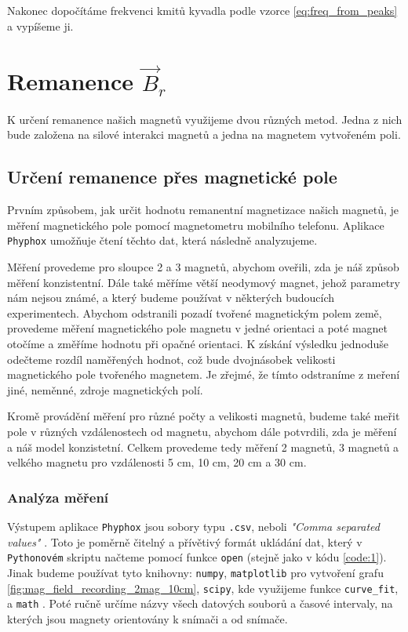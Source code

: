 Nakonec dopočítáme frekvenci kmitů kyvadla podle vzorce \ref{eq:freq_from_peaks} a vypíšeme ji.

\clearpage



\section{Remanence $\vec{B}_r$}
\label{sec:remanence_measurement}

K určení remanence našich magnetů využijeme dvou různých metod. Jedna z nich bude založena na silové interakci magnetů a jedna na magnetem vytvořeném poli.

\subsection{Určení remanence přes magnetické pole}

Prvním způsobem, jak určit hodnotu remanentní magnetizace našich magnetů, je měření magnetického pole pomocí magnetometru mobilního telefonu.
Aplikace \texttt{Phyphox} umožňuje čtení těchto dat, která následně analyzujeme.

Měření provedeme pro sloupce 2 a 3 magnetů, abychom oveřili, zda je náš způsob měření konzistentní.
Dále také měříme větší neodymový magnet, jehož parametry nám nejsou známé, a který budeme používat v některých budoucích experimentech.
Abychom odstranili pozadí tvořené magnetickým polem země, provedeme měření magnetického pole magnetu v jedné orientaci a poté magnet otočíme a změříme hodnotu při opačné orientaci.
K získání výsledku jednoduše odečteme rozdíl naměřených hodnot, což bude dvojnásobek velikosti magnetického pole tvořeného magnetem.
Je zřejmé, že tímto odstraníme z meření jiné, neměnné, zdroje magnetických polí.

Kromě provádění měření pro různé počty a velikosti magnetů, budeme také meřit pole v různých vzdálenostech od magnetu, abychom dále potvrdili, zda je měření a náš model konzistetní.
Celkem provedeme tedy měření 2 magnetů, 3 magnetů a velkého magnetu pro vzdálenosti 5 cm, 10 cm, 20 cm a 30 cm.

\subsubsection{Analýza měření}
Výstupem aplikace \texttt{Phyphox} jsou sobory typu \texttt{.csv}, neboli \textit{"Comma separated values"} \cite{csv}.
Toto je poměrně čitelný a přívětivý formát ukládání dat, který v \texttt{Pythonovém} skriptu načteme pomocí funkce \texttt{open} (stejně jako v kódu \ref{code:1}).
Jinak budeme používat tyto knihovny:
\texttt{numpy},
\texttt{matplotlib} pro vytvoření grafu \ref{fig:mag_field_recording_2mag_10cm},
\texttt{scipy}, kde využijeme funkce \texttt{curve\_fit}, a
\texttt{math} \cite{pymath}.
Poté ručně určíme názvy všech datových souborů a časové intervaly, na kterých jsou magnety orientovány k snímači a od snímače.

